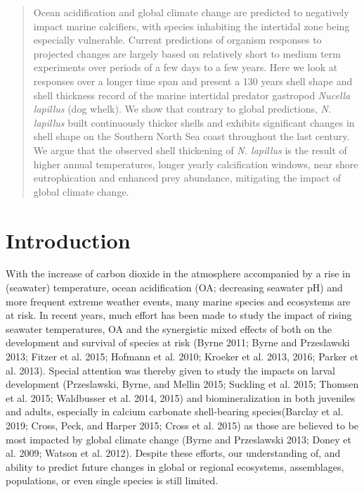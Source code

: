 \documentclass[smallextended]{svjour3}       %
\begin{document}
\begin{abstract}
Ocean acidification and global climate change are predicted to
negatively impact marine calcifiers, with species inhabiting the
intertidal zone being especially vulnerable. Current predictions of
organism responses to projected changes are largely based on relatively
short to medium term experiments over periods of a few days to a few
years. Here we look at responses over a longer time span and present a
130 years shell shape and shell thickness record of the marine
intertidal predator gastropod \emph{Nucella lapillus} (dog whelk). We
show that contrary to global predictions, \emph{N. lapillus} built
continuously thicker shells and exhibits significant changes in shell
shape on the Southern North Sea coast throughout the last century. We
argue that the observed shell thickening of \emph{N. lapillus} is the
result of higher annual temperatures, longer yearly calcification
windows, near shore eutrophication and enhanced prey abundance,
mitigating the impact of global climate change.
\\


\end{abstract}


\def\spacingset#1{\renewcommand{\baselinestretch}%
{#1}\small\normalsize} \spacingset{1}


\doublespacing

\hypertarget{intro}{%
\section{Introduction}\label{intro}}

With the increase of carbon dioxide in the atmosphere accompanied by a
rise in (seawater) temperature, ocean acidification (OA; decreasing
seawater pH) and more frequent extreme weather events, many marine
species and ecosystems are at risk. In recent years, much effort has
been made to study the impact of rising seawater temperatures, OA and
the synergistic mixed effects of both on the development and survival of
species at risk (Byrne 2011; Byrne and Przeslawski 2013; Fitzer et al.
2015; Hofmann et al. 2010; Kroeker et al. 2013, 2016; Parker et al.
2013). Special attention was thereby given to study the impacts on
larval development (Przeslawski, Byrne, and Mellin 2015; Suckling et al.
2015; Thomsen et al. 2015; Waldbusser et al. 2014, 2015) and
biomineralization in both juveniles and adults, especially in calcium
carbonate shell-bearing species(Barclay et al. 2019; Cross, Peck, and
Harper 2015; Cross et al. 2015) as those are believed to be most
impacted by global climate change (Byrne and Przeslawski 2013; Doney et
al. 2009; Watson et al. 2012). Despite these efforts, our understanding
of, and ability to predict future changes in global or regional
ecosystems, assemblages, populations, or even single species is still
limited.
\end{document}
